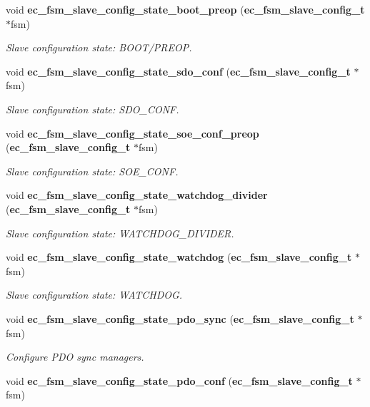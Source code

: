 \begin{DoxyCompactItemize}
void {\bf ec\-\_\-fsm\-\_\-slave\-\_\-config\-\_\-state\-\_\-boot\-\_\-preop} ({\bf ec\-\_\-fsm\-\_\-slave\-\_\-config\-\_\-t} $\ast$fsm)
\begin{DoxyCompactList}\small\item\em \-Slave configuration state\-: \-B\-O\-O\-T/\-P\-R\-E\-O\-P. \end{DoxyCompactList}\item 
void {\bf ec\-\_\-fsm\-\_\-slave\-\_\-config\-\_\-state\-\_\-sdo\-\_\-conf} ({\bf ec\-\_\-fsm\-\_\-slave\-\_\-config\-\_\-t} $\ast$fsm)
\begin{DoxyCompactList}\small\item\em \-Slave configuration state\-: \-S\-D\-O\-\_\-\-C\-O\-N\-F. \end{DoxyCompactList}\item 
void {\bf ec\-\_\-fsm\-\_\-slave\-\_\-config\-\_\-state\-\_\-soe\-\_\-conf\-\_\-preop} ({\bf ec\-\_\-fsm\-\_\-slave\-\_\-config\-\_\-t} $\ast$fsm)
\begin{DoxyCompactList}\small\item\em \-Slave configuration state\-: \-S\-O\-E\-\_\-\-C\-O\-N\-F. \end{DoxyCompactList}\item 
void {\bf ec\-\_\-fsm\-\_\-slave\-\_\-config\-\_\-state\-\_\-watchdog\-\_\-divider} ({\bf ec\-\_\-fsm\-\_\-slave\-\_\-config\-\_\-t} $\ast$fsm)
\begin{DoxyCompactList}\small\item\em \-Slave configuration state\-: \-W\-A\-T\-C\-H\-D\-O\-G\-\_\-\-D\-I\-V\-I\-D\-E\-R. \end{DoxyCompactList}\item 
void {\bf ec\-\_\-fsm\-\_\-slave\-\_\-config\-\_\-state\-\_\-watchdog} ({\bf ec\-\_\-fsm\-\_\-slave\-\_\-config\-\_\-t} $\ast$fsm)
\begin{DoxyCompactList}\small\item\em \-Slave configuration state\-: \-W\-A\-T\-C\-H\-D\-O\-G. \end{DoxyCompactList}\item 
void {\bf ec\-\_\-fsm\-\_\-slave\-\_\-config\-\_\-state\-\_\-pdo\-\_\-sync} ({\bf ec\-\_\-fsm\-\_\-slave\-\_\-config\-\_\-t} $\ast$fsm)
\begin{DoxyCompactList}\small\item\em \-Configure \-P\-D\-O sync managers. \end{DoxyCompactList}\item 
void {\bf ec\-\_\-fsm\-\_\-slave\-\_\-config\-\_\-state\-\_\-pdo\-\_\-conf} ({\bf ec\-\_\-fsm\-\_\-slave\-\_\-config\-\_\-t} $\ast$fsm)

\end{DoxyCompactItemize}
